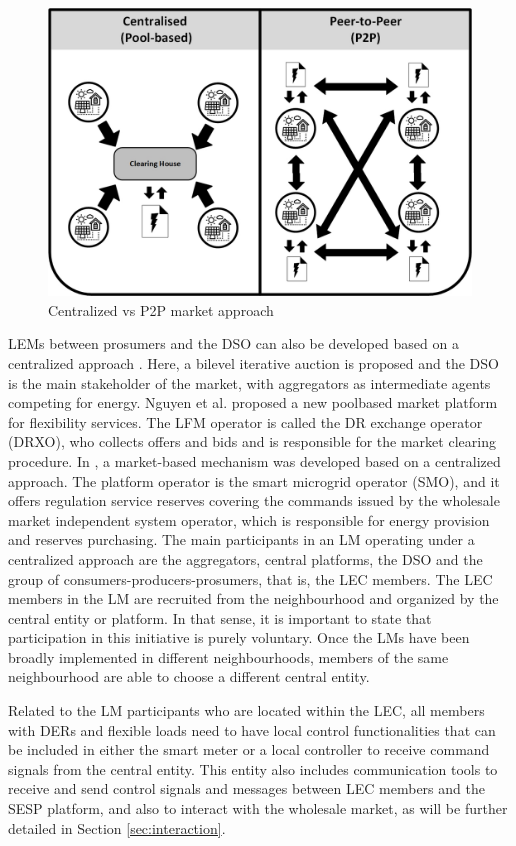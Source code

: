 \begin{figure}[h]
	\centering
	\includegraphics[width=0.7\columnwidth ]{ChapterIntro/Figures/CENTRALISED_P2P.jpg}
		\caption{Centralized vs P2P market approach}
	\label{fig:POOL_P2P}  
\end{figure}

LEMs between prosumers and the DSO can also be developed based on a centralized approach \cite{faqiry2017distributed}. Here, a bilevel iterative auction is proposed and the DSO is the main stakeholder of the market, with aggregators as intermediate agents competing for energy. Nguyen et al. \cite{nguyen2010pool} proposed a new poolbased market platform for flexibility services. The LFM operator is called the DR exchange operator (DRXO), who collects offers and bids and is responsible for the market clearing procedure. In \cite{paschalidis2012demand}, a market-based mechanism was developed based on a centralized approach. The platform operator is the smart microgrid operator (SMO), and it offers regulation service reserves covering the commands issued by the wholesale market independent system operator, which is responsible for energy provision and reserves purchasing. The main participants in an LM operating under a centralized approach are the aggregators, central platforms, the DSO and the group of consumers-producers-prosumers, that is, the LEC members. The LEC members in the LM are recruited from the neighbourhood and organized by the central entity or platform. In that sense, it is important to state that participation in this initiative is purely voluntary. Once the LMs have been broadly implemented in different neighbourhoods, members of the same neighbourhood are able to
choose a different central entity.

Related to the LM participants who are located within the LEC, all members with DERs and flexible loads need to have local control functionalities that can be included in either the smart meter or a local controller to receive command signals from the central entity. This entity also includes communication tools to receive and send control signals and messages between LEC members and the SESP platform, and also to interact with the wholesale market, as will be further detailed in Section \ref{sec:interaction}.

